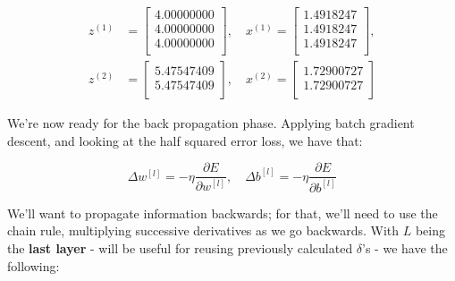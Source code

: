 \documentclass[12pt]{article}
\begin{document}
\begin{enumerate}[leftmargin=\labelsep]
        \begin{equation*}
          \begin{aligned}
            z^{(1)} & = \begin{bmatrix}
                          4.00000000 \\
                          4.00000000 \\
                          4.00000000 \\
                        \end{bmatrix}, \quad
            x^{(1)} = \begin{bmatrix}
                        1.4918247 \\
                        1.4918247 \\
                        1.4918247 \\
                      \end{bmatrix},         \\
            z^{(2)} & = \begin{bmatrix}
                          5.47547409 \\
                          5.47547409 \\
                        \end{bmatrix}, \quad
            x^{(2)} = \begin{bmatrix}
                        1.72900727 \\
                        1.72900727 \\
                      \end{bmatrix}
          \end{aligned}
        \end{equation*}

        We're now ready for the back propagation phase. Applying batch gradient descent,
        and looking at the half squared error loss, we have that:

        \begin{equation*}
          \Delta w^{[l]} = - \eta \frac{\partial E}{\partial w^{[l]}}, \quad
          \Delta b^{[l]} = - \eta \frac{\partial E}{\partial b^{[l]}}
        \end{equation*}

        We'll want to propagate information backwards; for that, we'll need to use
        the chain rule, multiplying successive derivatives as we go backwards.
        With $L$ being the \textbf{last layer} - will be useful for reusing previously
        calculated $\delta$'s - we have the following:


\end{enumerate}
\end{document}
